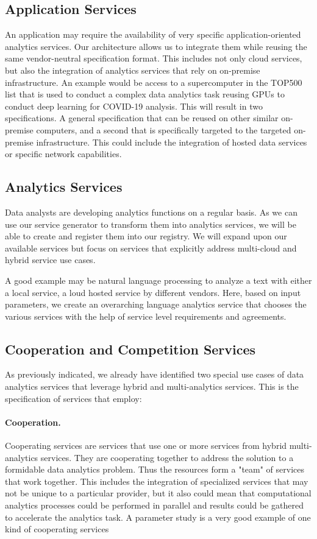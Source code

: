 \subsection{Application Services}

An application may require the availability of very specific
application-oriented analytics services. Our architecture allows us to
integrate them while reusing the same vendor-neutral specification
format. This includes not only cloud services, but also the
integration of analytics services that rely on on-premise
infrastructure. An example would be access to a supercomputer in the
TOP500 list that is used to conduct a complex data analytics task
reusing GPUs to conduct deep learning for COVID-19 analysis.  This
will result in two specifications. A general specification that can be
reused on other similar on-premise computers, and a second that is
specifically targeted to the targeted on-premise infrastructure. This
could include the integration of hosted data services or specific
network capabilities.

\subsection{Analytics Services}

Data analysts are developing analytics functions on a regular
basis. As we can use our service generator to transform them into
analytics services, we will be able to create and register them into
our registry. We will expand upon our available services but focus on
services that explicitly address multi-cloud and hybrid service use
cases.

A good example may be natural language processing to analyze a text
with either a local service, a loud hosted service by different
vendors. Here, based on input parameters, we create an overarching
language analytics service that chooses the various services with the
help of service level requirements and agreements.

\subsection{Cooperation and Competition Services}

As previously indicated, we already have identified two special use
cases of data analytics services that leverage hybrid and
multi-analytics 
services. This is the specification of services that
employ:


\paragraph{Cooperation.} Cooperating services are services that use one or
more services from hybrid multi-analytics services. They are
cooperating together to address the solution to a formidable data
analytics problem. Thus the resources form a "team" of services that
work together. This includes the integration of specialized services
that may not be unique to a particular provider, but it also could
mean that computational analytics processes could be performed in
parallel and results could be gathered to accelerate the analytics
task. A parameter study is a very good example of one kind of
cooperating services

